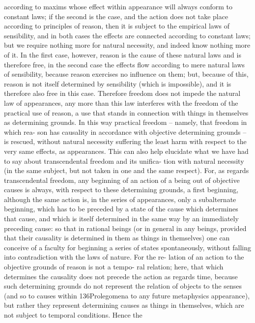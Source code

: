 according to maxims whose effect within appearance will always conform
to constant laws; if the second is the case, and the action does not take
place according to principles of reason, then it is subject to the empirical
laws of sensibility, and in both cases the effects are connected according
to constant laws; but we require nothing more for natural necessity, and
indeed know nothing more of it. In the ﬁrst case, however, reason is the
cause of these natural laws and is therefore free, in the second case the
effects ﬂow according to mere natural laws of sensibility, because reason
exercises no inﬂuence on them; but, because of this, reason is not itself
determined by sensibility (which is impossible), and it is therefore also
free in this case. Therefore freedom does not impede the natural law of
appearances, any more than this law interferes with the freedom of the
practical use of reason, a use that stands in connection with things in
themselves as determining grounds.
In this way practical freedom – namely, that freedom in which rea-
son has causality in accordance with objective determining grounds – is
rescued, without natural necessity suffering the least harm with respect
to the very same effects, as appearances. This can also help elucidate
what we have had to say about transcendental freedom and its uniﬁca-
tion with natural necessity (in the same subject, but not taken in one and
the same respect). For, as regards transcendental freedom, any beginning
of an action of a being out of objective causes is always, with respect to
these determining grounds, a ﬁrst beginning, although the same action
is, in the series of appearances, only a subalternate beginning, which has
to be preceded by a state of the cause which determines that cause, and
which is itself determined in the same way by an immediately preceding
cause: so that in rational beings (or in general in any beings, provided
that their causality is determined in them as things in themselves) one
can conceive of a faculty for beginning a series of states spontaneously,
without falling into contradiction with the laws of nature. For the re-
lation of an action to the objective grounds of reason is not a tempo-
ral relation; here, that which determines the causality does not precede
the action as regards time, because such determining grounds do not
represent the relation of objects to the senses (and so to causes within
136Prolegomena to any future metaphysics
appearance), but rather they represent determining causes as things in
themselves, which are not subject to temporal conditions. Hence the
